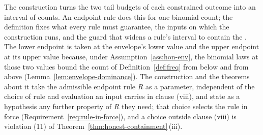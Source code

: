 
The construction turns the two tail budgets of each constrained outcome into
an interval of counts. An endpoint rule does this for one binomial count; the
definition fixes what every rule must guarantee, the inputs on which the
construction runs, and the guard that widens a rule's interval to contain the
. The lower endpoint is taken at the envelope's lower
value and the upper endpoint at its upper value because, under
Assumption~\ref{ass:hon-env}, the binomial laws at those two values bound the
count of Definition~\ref{def:freq} from below and from above
(Lemma~\ref{lem:envelope-dominance}). The construction and the theorems about
it take the admissible endpoint rule $R$ as a parameter, independent of the
choice of rule and evaluation an input carries in clause (viii), and state as
a hypothesis any further property of $R$ they need; that choice selects the
rule in force (Requirement~\ref{req:rule-in-force}), and a choice outside
clause (viii) is violation (11) of
Theorem~\ref{thm:honest-containment}\,(iii).


